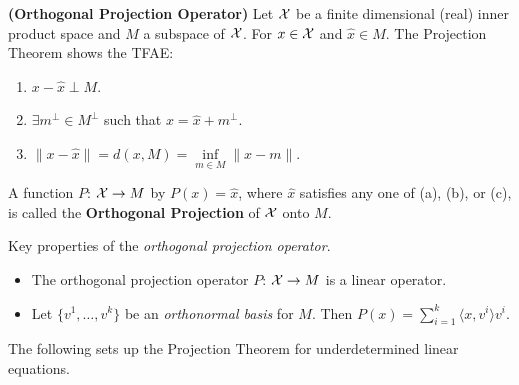 \begin{definition} \textbf{(Orthogonal Projection Operator)} Let $\cal X$ be a finite dimensional (real) inner product space and $M$ a subspace of $\cal X$. For $x \in \cal X$ and $\widehat{x} \in M$. The Projection Theorem shows the TFAE:
\begin{enumerate}
\renewcommand{\labelenumi}{(\alph{enumi})}
    \item $x-\widehat{x}   \perp M $.

    \item $\exists m^\perp \in M^{\bot}$ such that  $ x=\widehat{x}  + m^\perp $.

    \item $ \|x-\widehat{x} \|=d(x,M)=\inf\limits_{m \in M} \|x-m\|$.
\end{enumerate}
A function $P$: ${\cal X}\to M$ by $P(x)=\widehat{x} $, where $\widehat{x} $ satisfies any one of (a), (b), or (c), is called the \textbf{Orthogonal Projection} of $\cal X$ onto $M$.
\end{definition}


\begin{exercise} Key properties of the \emph{orthogonal projection operator}.
\begin{itemize}
    \item The orthogonal projection operator $P$: ${\cal X}\rightarrow M$ is a linear operator.
    \item  Let $\{v^1,\ldots ,v^k\}$ be an \emph{orthonormal basis} for $M$. Then
$P(x)= \sum\limits_{i=1}^k  \langle x,v^i \rangle  v^i$.
\end{itemize}
\end{exercise}


The following sets up the Projection Theorem for underdetermined linear equations.\\

